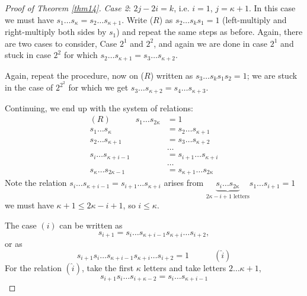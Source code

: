 \begin{proof}[Proof of Theorem \ref{thm14}]
{\em Case 2}: $2j-2i=k$, i.e. $i=1$, $j=\kappa+1$. In this case we must have
$s_1 \dots s_\kappa = s_2 \dots s_{\kappa+1}$. Write ($R$) as
$s_2 \dots s_k s_1 = 1$ (left-multiply and right-multiply both sides by $s_1$)
and repeat the same steps as before. Again, there are two cases to consider,
Case $2^1$ and $2^2$, and again we are done in case $2^1$ and stuck in case
$2^2$ for which $s_2 \dots s_{\kappa+1} = s_3 \dots s_{\kappa+2}$.

Again, repeat the procedure, now on ($R$) written as $s_3 \dots s_k s_1 s_2 = 1$;
we are stuck in the case of $2^{2^2}$ for which we get $s_3 \dots s_{\kappa+2}
= s_4 \dots s_{\kappa+3}$.

Continuing, we end up with the system of relations:
\begin{align*}
    (R) \quad \quad \quad s_1 \dots s_{2 \kappa} &= 1 \\
    s_1 \dots s_{\kappa} &= s_2 \dots s_{\kappa+1} \\
    s_2 \dots s_{\kappa+1} &= s_3 \dots s_{\kappa+2} \\
    & \dots \\
    s_i \dots s_{\kappa+i-1} &= s_{i+1} \dots s_{\kappa+i} \\
    & \dots \\
    s_\kappa \dots s_{2\kappa-1} &= s_{\kappa+1} \dots s_{2\kappa}
\end{align*}
Note the relation $s_i \dots s_{\kappa+i-1} = s_{i+1} \dots s_{\kappa+i}$ arises
from $\underbrace{s_i \dots s_{2\kappa}}_{2\kappa-i+1 \text{ letters}}
s_1 \dots s_{i+1} = 1$ we must have $\kappa+1 \leq 2\kappa-i+1$, so $i \leq \kappa$.

The case $(i)$ can be written as
\[
    s_{i+1} = s_i \dots s_{\kappa+i-1} s_{\kappa+i} \dots s_{i+2},
\]
or as
\[
    s_{i+1} s_i \dots s_{\kappa+i-1} s_{\kappa+i} \dots s_{i+2} = 1
    \quad \quad \quad (\hat{i}) %
\]
For the relation $(\hat{i})$, take the first $\kappa$ letters and take letters
$2 \dots \kappa+1$,
\[
    s_{i+1} s_i \dots s_{i+\kappa-2} = s_i \dots s_{\kappa+i-1}
\]

\end{proof}
